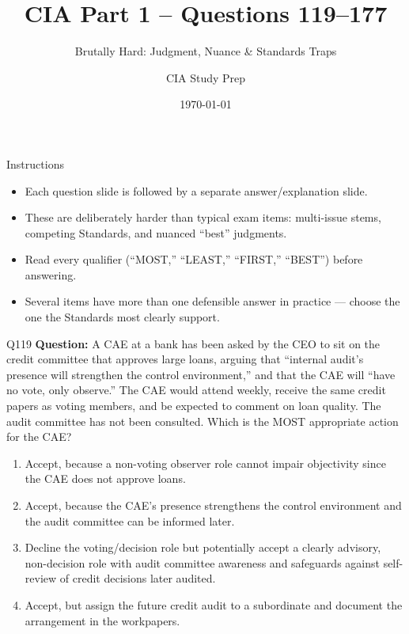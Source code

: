 \documentclass[aspectratio=169,10pt]{beamer}
\title{CIA Part 1 -- Questions 119--177}
\subtitle{Brutally Hard: Judgment, Nuance \& Standards Traps}
\author{CIA Study Prep}
\date{\today}
\begin{document}
	
	\begin{frame}
		\titlepage
	\end{frame}
	
	\begin{frame}{Instructions}
		\begin{itemize}
			\item Each question slide is followed by a separate answer/explanation slide.
			\item These are deliberately harder than typical exam items: multi-issue stems, competing Standards, and nuanced ``best'' judgments.
			\item Read every qualifier (``MOST,'' ``LEAST,'' ``FIRST,'' ``BEST'') before answering.
			\item Several items have more than one defensible answer in practice --- choose the one the Standards most clearly support.
		\end{itemize}
	\end{frame}
	
	\begin{frame}[t]{Q119}
		\small
		\textbf{Question:} A CAE at a bank has been asked by the CEO to sit on the credit committee that approves large loans, arguing that ``internal audit's presence will strengthen the control environment,'' and that the CAE will ``have no vote, only observe.'' The CAE would attend weekly, receive the same credit papers as voting members, and be expected to comment on loan quality. The audit committee has not been consulted. Which is the MOST appropriate action for the CAE?
		\begin{enumerate}[label=\Alph*.,itemsep=1pt,topsep=2pt]
			\item Accept, because a non-voting observer role cannot impair objectivity since the CAE does not approve loans.
			\item Accept, because the CAE's presence strengthens the control environment and the audit committee can be informed later.
			\item Decline the voting/decision role but potentially accept a clearly advisory, non-decision role with audit committee awareness and safeguards against self-review of credit decisions later audited.
			\item Accept, but assign the future credit audit to a subordinate and document the arrangement in the workpapers.
		\end{enumerate}
	\end{frame}
	
\end{document}

